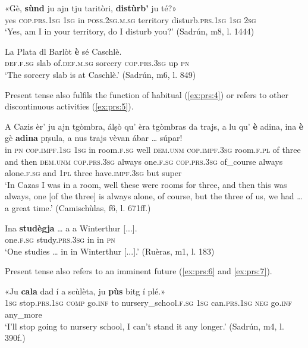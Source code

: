 \ea\label{ex:prs:2}
\gll «Gè, \textbf{sùnd} ju ajn tju taritòri, \textbf{distùrb’} ju té?»   \\
yes \textsc{cop.prs.1sg} \textsc{1sg} in \textsc{poss.2sg.m.sg} territory disturb.\textsc{prs.1sg} \textsc{1sg} \textsc{2sg} \\
\glt `Yes, am I in your territory, do I disturb you?' (Sadrún, m8, l. 1444)
\z

\ea\label{ex:prs:3}
\gll    La Plata dl Barlòt \textbf{è} sé Caschlè.\\
\textsc{def.f.sg} slab of.\textsc{def.m.sg} sorcery \textsc{cop.prs.3sg} up \textsc{pn}\\
\glt `The sorcery slab is at Caschlè.' (Sadrún, m6, l. 849)
\z

Present tense also fulfils the function of habitual (\ref{ex:prs:4}) or refers to other discontinuous activities (\ref{ex:prs:5}).
 
\ea\label{ex:prs:4}
\gll    A Cazis èr’ ju ajn tgòmbra, álṣò qu’ èra tgòmbras da trajs, a lu qu’ \textbf{è} adina, ina \textbf{è} gè \textbf{adina} pr̩sula, a nus trajs vèvan ábar … súpar!\\
in \textsc{pn} \textsc{cop.impf.1sg}	\textsc{1sg} in room.\textsc{f.sg} well \textsc{dem.unm} \textsc{cop.impf.3sg} room.\textsc{f.pl} of three and then \textsc{dem.unm} \textsc{cop.prs.3sg} always  one.\textsc{f.sg} \textsc{cop.prs.3sg} of\_course always alone.\textsc{f.sg} and \textsc{1pl} three have.\textsc{impf.3sg} but {} super\\
\glt `In Cazas I was in a room, well these were rooms for three, and then this was always, one [of the three] is always alone, of course, but the three of us, we had … a great time.' (Camischùlas, f6, l.  671ff.)
\z

\ea\label{ex:prs:5}
\gll    Ina \textbf{studègja} … a a Winterthur [...].\\
one.\textsc{f.sg} study.\textsc{prs.3sg} {} in in \textsc{pn}\\
\glt `One studies … in in Winterthur [...].' (Ruèras, m1, l. 183)
\z

Present tense also refers to an imminent future (\ref{ex:prs:6} and \ref{ex:prs:7}). 

\ea\label{ex:prs:6}
\gll  «Ju \textbf{cala} dad í a scùlèta, ju \textbf{pùs} bitg í plé.»\\
\textsc{1sg} stop.\textsc{prs.1sg} \textsc{comp} go.\textsc{inf} to nursery\_school.\textsc{f.sg} \textsc{1sg} can.\textsc{prs.1sg} \textsc{neg} go.\textsc{inf} any\_more  \\
\glt `I’ll stop going to nursery school, I can’t stand it any longer.' (Sadrún, m4, l. 390f.)
\z

